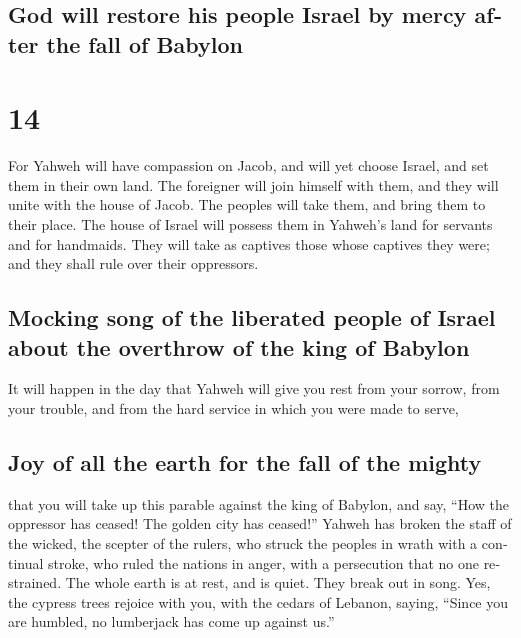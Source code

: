 \begin{paracol}{2}
\begin{otherlanguage}{english}
{\subsection{God will restore his people Israel by mercy after the fall
of
Babylon}\label{god-will-restore-his-people-israel-by-mercy-after-the-fall-of-babylon}}

\hypertarget{section-27}{%
\section{14}\label{section-27}}

 For Yahweh will have compassion on Jacob, and will yet
choose Israel, and set them in their own land. The foreigner will join
himself with them, and they will unite with the house of Jacob.
 The peoples will take them, and bring them to their
place. The house of Israel will possess them in Yahweh's land for
servants and for handmaids. They will take as captives those whose
captives they were; and they shall rule over their oppressors.

\hypertarget{mocking-song-of-the-liberated-people-of-israel-about-the-overthrow-of-the-king-of-babylon}{%
\subsection{Mocking song of the liberated people of Israel about the
overthrow of the king of
Babylon}\label{mocking-song-of-the-liberated-people-of-israel-about-the-overthrow-of-the-king-of-babylon}}

 It will happen in the day that Yahweh will give you rest
from your sorrow, from your trouble, and from the hard service in which
you were made to serve,

\hypertarget{joy-of-all-the-earth-for-the-fall-of-the-mighty}{%
\subsection{Joy of all the earth for the fall of the
mighty}\label{joy-of-all-the-earth-for-the-fall-of-the-mighty}}

 that you will take up this parable against the king of
Babylon, and say, ``How the oppressor has ceased! The golden city has
ceased!''  Yahweh has broken the staff of the wicked, the
scepter of the rulers,  who struck the peoples in wrath
with a continual stroke, who ruled the nations in anger, with a
persecution that no one restrained.  The whole earth is at
rest, and is quiet. They break out in song.  Yes, the
cypress trees rejoice with you, with the cedars of Lebanon, saying,
``Since you are humbled, no lumberjack has come up against us.''


\end{otherlanguage}
\end{paracol}
